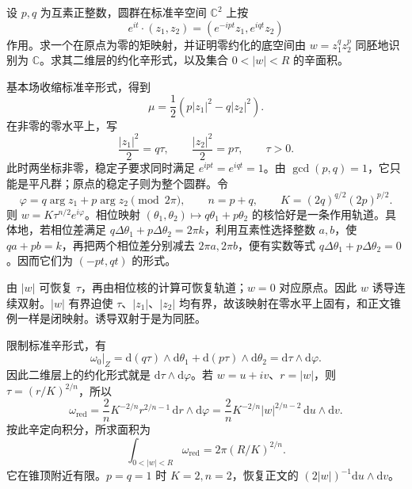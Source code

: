 \begin{optionalexercise}\label{g4:ex:10:opposite-weight-area}
	设 \(p,q\) 为互素正整数，圆群在标准辛空间 \(\mathbb C^2\) 上按
	\[
		e^{it}\cdot(z_1,z_2)=(e^{-ipt}z_1,e^{iqt}z_2)
	\]
	作用。求一个在原点为零的矩映射，并证明零约化的底空间由 \(w=z_1^qz_2^p\) 同胚地识别为 \(\mathbb C\)。求其二维层的约化辛形式，以及集合 \(0<|w|<R\) 的辛面积。
\end{optionalexercise}
\begin{solution}
	基本场收缩标准辛形式，得到
	\[
		\mu=\frac12(p|z_1|^2-q|z_2|^2).
	\]
	在非零的零水平上，写
	\[
		\frac{|z_1|^2}{2}=q\tau,
		\qquad \frac{|z_2|^2}{2}=p\tau,
		\qquad \tau>0.
	\]
	此时两坐标非零，稳定子要求同时满足 \(e^{ipt}=e^{iqt}=1\)。由 \(\gcd(p,q)=1\)，它只能是平凡群；原点的稳定子则为整个圆群。令
	\[
		\varphi=q\arg z_1+p\arg z_2\pmod{2\pi},
		\qquad n=p+q,
		\qquad K=(2q)^{q/2}(2p)^{p/2}.
	\]
	则 \(w=K\tau^{n/2}e^{i\varphi}\)。相位映射 \((\theta_1,\theta_2)\mapsto q\theta_1+p\theta_2\) 的核恰好是一条作用轨道。具体地，若相位差满足 \(q\Delta\theta_1+p\Delta\theta_2=2\pi k\)，利用互素性选择整数 \(a,b\)，使 \(qa+pb=k\)，再把两个相位差分别减去 \(2\pi a,2\pi b\)，便有实数等式 \(q\Delta\theta_1+p\Delta\theta_2=0\)。因而它们为 \((-pt,qt)\) 的形式。

	由 \(|w|\) 可恢复 \(\tau\)，再由相位核的计算可恢复轨道；\(w=0\) 对应原点。因此 \(w\) 诱导连续双射。\(|w|\) 有界迫使 \(\tau\)、\(|z_1|\)、\(|z_2|\) 均有界，故该映射在零水平上固有，和正文锥例一样是闭映射。诱导双射于是为同胚。

	限制标准辛形式，有
	\[
		\omega_0|_Z
		=\mathrm{d}(q\tau)\wedge\mathrm{d}\theta_1
		+\mathrm{d}(p\tau)\wedge\mathrm{d}\theta_2
		=\mathrm{d}\tau\wedge\mathrm{d}\varphi.
	\]
	因此二维层上的约化形式就是 \(\mathrm{d}\tau\wedge\mathrm{d}\varphi\)。若 \(w=u+iv\)、\(r=|w|\)，则 \(\tau=(r/K)^{2/n}\)，所以
	\[
		\omega_{\mathrm{red}}
		=\frac2nK^{-2/n}r^{2/n-1}\,\mathrm{d}r\wedge\mathrm{d}\varphi
		=\frac2nK^{-2/n}|w|^{2/n-2}\,\mathrm{d}u\wedge\mathrm{d}v.
	\]
	按此辛定向积分，所求面积为
	\[
		\int_{0<|w|<R}\omega_{\mathrm{red}}
		=2\pi(R/K)^{2/n}.
	\]
	它在锥顶附近有限。\(p=q=1\) 时 \(K=2,n=2\)，恢复正文的 \((2|w|)^{-1}\mathrm{d}u\wedge\mathrm{d}v\)。
\end{solution}

